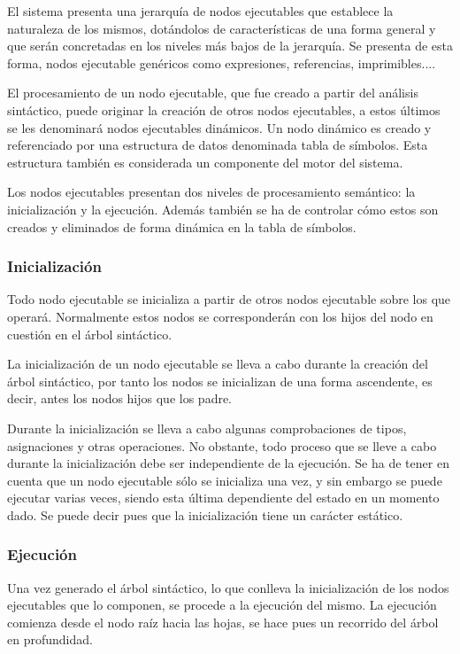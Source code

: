 El sistema presenta una jerarquía de nodos ejecutables que establece la naturaleza de los mismos, dotándolos de características de una forma general y que serán concretadas en los niveles más
bajos de la jerarquía. Se presenta de esta forma, nodos ejecutable genéricos como expresiones, referencias, imprimibles....

El procesamiento de un nodo ejecutable, que fue creado a partir del análisis sintáctico, puede originar la creación de otros nodos ejecutables, a estos 
últimos se les denominará nodos ejecutables dinámicos. Un nodo dinámico es creado y referenciado por una estructura de datos denominada tabla de símbolos. 
Esta estructura también es considerada un componente del motor del sistema.

Los nodos ejecutables presentan dos niveles de procesamiento semántico: la inicialización y la ejecución. Además también se ha de controlar cómo estos son creados y eliminados de 
forma dinámica en la tabla de símbolos. 



\subsubsection{Inicialización}
Todo nodo ejecutable se inicializa a partir de otros nodos ejecutable sobre los que operará. Normalmente estos nodos se corresponderán con los hijos del nodo en cuestión en el árbol sintáctico. 

La inicialización de un nodo ejecutable se lleva a cabo durante la creación del árbol sintáctico, por tanto los nodos se inicializan de una forma ascendente, es decir,
antes los nodos hijos que los padre.

Durante la inicialización se lleva a cabo algunas comprobaciones de tipos, asignaciones y otras operaciones. No obstante, todo proceso que se lleve a cabo durante la
inicialización debe ser independiente de la ejecución. Se ha de tener en cuenta que un nodo ejecutable sólo se inicializa una vez, y sin embargo se puede ejecutar varias
veces, siendo esta última dependiente del estado en un momento dado. Se puede decir pues que la inicialización tiene un carácter estático.

\subsubsection{Ejecución}
Una vez generado el árbol sintáctico, lo que conlleva la inicialización de los nodos ejecutables que lo componen, se procede a la ejecución del mismo. La ejecución comienza desde el 
nodo raíz hacia las hojas, se hace pues un recorrido del árbol en profundidad.

